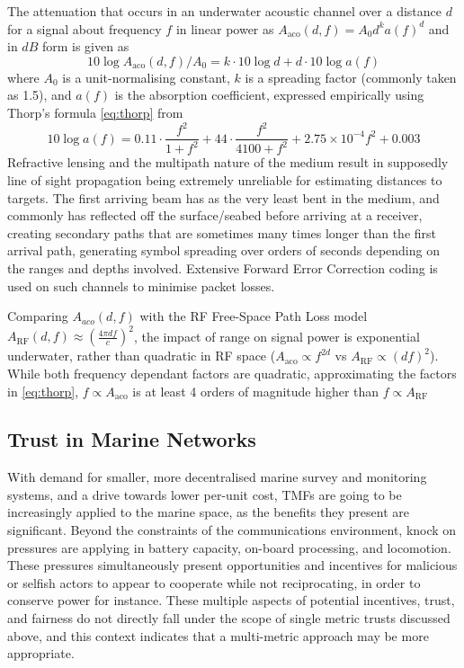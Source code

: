 \documentclass[runningheads,a4paper]{llncs}
\begin{document}
The attenuation that occurs in an underwater acoustic channel over a distance $d$ for a signal about frequency $f$ in linear power as $A_{\text{aco}}(d,f) = A_0d^ka(f)^d$ and in $dB$ form is given as 
%
\begin{equation}
  \label{eq:acoattenuationdb}
  10 \log A_{\text{aco}}(d,f)/A_0 = k \cdot 10 \log d + d \cdot 10 \log a(f)
\end{equation}
%
where $A_0$ is a unit-normalising constant, $k$ is a spreading factor (commonly taken as 1.5), and $a(f)$ is the absorption coefficient, expressed empirically using Thorp's formula \eqref{eq:thorp} from \cite{Stojanovic2007}
%
\begin{equation}
  \label{eq:thorp}
  10 \log a(f) = 0.11 \cdot \frac{f^2}{1+f^2} + 44\cdot\frac{f^2}{4100+f^2}+ 2.75\times10^{-4} f^2 + 0.003
\end{equation}
%
Refractive lensing and the multipath nature of the medium result in supposedly line of sight propagation being extremely unreliable for estimating distances to targets.
The first arriving beam has as the very least bent in the medium, and commonly has reflected off the surface/seabed before arriving at a receiver, creating secondary paths that are sometimes many times longer than the first arrival path, generating symbol spreading over orders of seconds depending on the ranges and depths involved.
Extensive Forward Error Correction coding is used on such channels to minimise packet losses.

Comparing $A_{aco}(d,f)$ with the RF Free-Space Path Loss model $A_{\text{RF}}(d,f) \approx \left( \frac{4\pi d f}{c} \right)^2$, the impact of range on signal power is exponential underwater, rather than quadratic in RF space ($A_{\text{aco}} \propto f^{2d}$ vs $A_{\text{RF}} \propto (df)^2$). 
While both frequency dependant factors are quadratic, approximating the factors in \eqref{eq:thorp}, $f\propto A_{\text{aco}}$ is at least 4 orders of magnitude higher than $f\propto A_{\text{RF}}$


\subsection{Trust in Marine Networks}\label{sec:trust_in_marine}

With demand for smaller, more decentralised marine survey and monitoring systems, and a drive towards lower per-unit cost, TMFs are going to be increasingly applied to the marine space, as the benefits they present are significant.
Beyond the constraints of the communications environment, knock on pressures are applying in battery capacity, on-board processing, and locomotion.
These pressures simultaneously present opportunities and incentives for malicious or selfish actors to appear to cooperate while not reciprocating, in order to conserve power for instance.
These multiple aspects of potential incentives, trust, and fairness do not directly fall under the scope of single metric trusts discussed above, and this context indicates that a multi-metric approach may be more appropriate.
\end{document}
